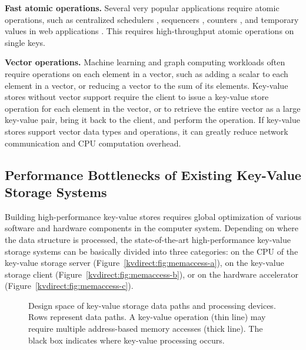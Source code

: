 {{\textbf{Fast atomic operations.} Several very popular applications require atomic operations, such as centralized schedulers \cite{perry2014fastpass}, sequencers \cite{kalia2016design,eris}, counters \cite{zhu2015packet}, and temporary values in web applications \cite{atikoglu2012workload}. This requires high-throughput atomic operations on single keys.

\textbf{Vector operations.} Machine learning and graph computing workloads \cite{li2014scaling,shao2013trinity,xiao17tux2} often require operations on each element in a vector, such as adding a scalar to each element in a vector, or reducing a vector to the sum of its elements. Key-value stores without vector support require the client to issue a key-value store operation for each element in the vector, or to retrieve the entire vector as a large key-value pair, bring it back to the client, and perform the operation. If key-value stores support vector data types and operations, it can greatly reduce network communication and CPU computation overhead.

\subsection{Performance Bottlenecks of Existing Key-Value Storage Systems}
\label{kvdirect:sec:state-of-the-art-kvs}

Building high-performance key-value stores requires global optimization of various software and hardware components in the computer system. Depending on where the data structure is processed, the state-of-the-art high-performance key-value storage systems can be basically divided into three categories: on the CPU of the key-value storage server (Figure~\ref{kvdirect:fig:memaccess-a}), on the key-value storage client (Figure~\ref{kvdirect:fig:memaccess-b}), or on the hardware accelerator (Figure~\ref{kvdirect:fig:memaccess-c}).

\begin{figure*}[htbp]
	\centering
	\caption{Design space of key-value storage data paths and processing devices. Rows represent data paths. A key-value operation (thin line) may require multiple address-based memory accesses (thick line). The black box indicates where key-value processing occurs.}
	\label{kvdirect:fig:memaccess}
\end{figure*}

}}
